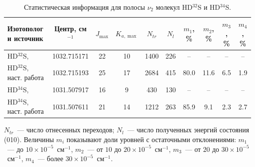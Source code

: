 \begin{table}[htbp]
\centering
\caption{Статистическая информация для полосы $\nu_2$ молекул HD$^{32}$S и HD$^{34}$S.}
\label{tab:hds_statistics}
\begingroup
\scriptsize
\setlength{\tabcolsep}{2pt}
\renewcommand{\arraystretch}{1.05}
\begin{tabular}{@{}lccccccccc@{}}
\hline
Изотополог и источник &
Центр, см$^{-1}$ &
$J_{\max}$ &
$K_{a,\max}$ &
$N_{tr}$ &
$N_l$ &
$m_1$, \% &
$m_2$, \% &
$m_3$, \% &
$m_4$, \% \\
\hline
HD$^{32}$S, \cite{hds_ulenikov1995} & 1032.715171 & 22 & 10 & 1400 & 226 & --   & --   & --  & --  \\
HD$^{32}$S, наст. работа             & 1032.715193 & 25 & 17 & 2684 & 415 & 80.0 & 11.6 & 6.5 & 1.9 \\
HD$^{34}$S, \cite{hds_ulenikov1995} & 1031.507917 & 16 & 9  & 430  & 130 & --   & --   & --  & --  \\
HD$^{34}$S, наст. работа             & 1031.507611 & 21 & 14 & 1212 & 263 & 85.9 & 9.1  & 2.3 & 2.7 \\
\hline
\end{tabular}
\endgroup

\vspace{0.3em}
\begin{minipage}{0.98\linewidth}
\footnotesize
$N_{tr}$~--- число отнесенных переходов; $N_l$~--- число полученных энергий состояния (010).
Величины $m_i$ показывают доли уровней с остаточными отклонениями:
$m_1$~--- до $10 \times 10^{-5}$~см$^{-1}$,
$m_2$~--- от $10$ до $20 \times 10^{-5}$~см$^{-1}$,
$m_3$~--- от $20$ до $30 \times 10^{-5}$~см$^{-1}$,
$m_4$~--- более $30 \times 10^{-5}$~см$^{-1}$.
\end{minipage}
\end{table}